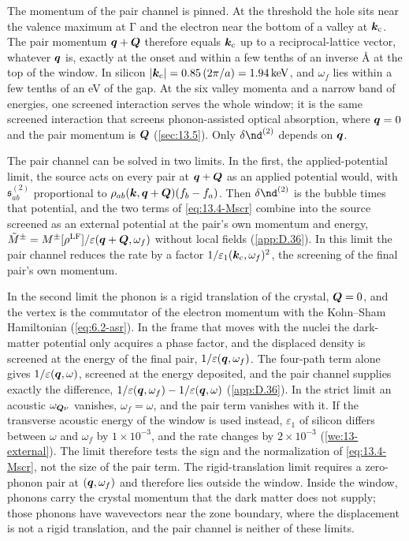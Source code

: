 The momentum of the pair channel is pinned. At the threshold the hole sits near the valence maximum at $\mathrm{\Gamma}$ and the electron near the bottom of a valley at $\bm{k}_{\mathrm{c}}$. The pair momentum $\bm{q}+\bm{Q}$ therefore equals $\bm{k}_{\mathrm{c}}$ up to a reciprocal-lattice vector, whatever $\bm{q}$ is, exactly at the onset and within a few tenths of an inverse \si{\angstrom} at the top of the window. In silicon $|\bm{k}_{\mathrm{c}}| = 0.85\,(2\pi/a) = \SI{1.94}{keV}$, and $\omega_f$ lies within a few tenths of an eV of the gap. At the six valley momenta and a narrow band of energies, one screened interaction serves the whole window; it is the same screened interaction that screens phonon-assisted optical absorption, where $\bm{q} = 0$ and the pair momentum is $\bm{Q}$ (\cref{sec:13.5}). Only $\delta\nd^{(2)}$ depends on $\bm{q}$.

The pair channel can be solved in two limits. In the first, the applied-potential limit, the source acts on every pair at $\bm{q}+\bm{Q}$ as an applied potential would, with $\mathfrak{s}^{(2)}_{ab}$ proportional to $\rho_{ab}(\bm{k},\bm{q}+\bm{Q})(f_b - f_a)$. Then $\delta\nd^{(2)}$ is the bubble times that potential, and the two terms of \cref{eq:13.4-Mscr} combine into the source screened as an external potential at the pair's own momentum and energy, $\tilde M^\pm = M^\pm[\rho^{\mathrm{LF}}]/\varepsilon(\bm{q}+\bm{Q},\omega_f)$ without local fields (\cref{app:D.36}). In this limit the pair channel reduces the rate by a factor $1/\varepsilon_1(\bm{k}_{\mathrm{c}},\omega_f)^2$, the screening of the final pair's own momentum.

In the second limit the phonon is a rigid translation of the crystal, $\bm{Q} = 0$, and the vertex is the commutator of the electron momentum with the Kohn--Sham Hamiltonian (\cref{eq:6.2-asr}). In the frame that moves with the nuclei the dark-matter potential only acquires a phase factor, and the displaced density is screened at the energy of the final pair, $1/\varepsilon(\bm{q},\omega_f)$. The four-path term alone gives $1/\varepsilon(\bm{q},\omega)$, screened at the energy deposited, and the pair channel supplies exactly the difference, $1/\varepsilon(\bm{q},\omega_f) - 1/\varepsilon(\bm{q},\omega)$ (\cref{app:D.36}). In the strict limit an acoustic $\omega_{\bm{Q}\nu}$ vanishes, $\omega_f = \omega$, and the pair term vanishes with it. If the transverse acoustic energy of the window is used instead, $\varepsilon_1$ of silicon differs between $\omega$ and $\omega_f$ by $1\times10^{-3}$, and the rate changes by $2\times10^{-3}$ (\cref{we:13-external}). The limit therefore tests the sign and the normalization of \cref{eq:13.4-Mscr}, not the size of the pair term. The rigid-translation limit requires a zero-phonon pair at $(\bm{q},\omega_f)$ and therefore lies outside the window. Inside the window, phonons carry the crystal momentum that the dark matter does not supply; those phonons have wavevectors near the zone boundary, where the displacement is not a rigid translation, and the pair channel is neither of these limits.

